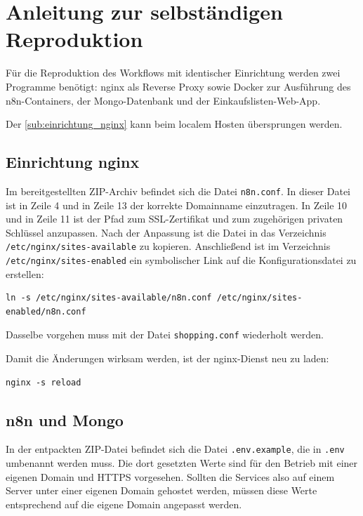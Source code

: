 \section{Anleitung zur selbständigen Reproduktion}\label{sec:cook} %
Für die Reproduktion des Workflows mit identischer Einrichtung werden zwei Programme benötigt: nginx
als Reverse Proxy sowie Docker zur Ausführung des n8n-Containers, der Mongo-Datenbank und der
Einkaufslisten-Web-App.

Der \autoref{sub:einrichtung_nginx} kann beim localem Hosten übersprungen werden.

\subsection{Einrichtung nginx}\label{sub:einrichtung_nginx} %
Im bereitgestellten ZIP-Archiv befindet sich die Datei \verb|n8n.conf|. In dieser Datei ist in Zeile
4 und in Zeile 13 der korrekte Domainname einzutragen. In Zeile 10 und in Zeile 11 ist der Pfad zum
SSL-Zertifikat und zum zugehörigen privaten Schlüssel anzupassen. Nach der Anpassung ist die Datei
in das Verzeichnis \verb|/etc/nginx/sites-available| zu kopieren. Anschließend ist im Verzeichnis
\verb|/etc/nginx/sites-enabled| ein symbolischer Link auf die Konfigurationsdatei zu erstellen:

\begin{verbatim}
ln -s /etc/nginx/sites-available/n8n.conf /etc/nginx/sites-enabled/n8n.conf
\end{verbatim}

Dasselbe vorgehen muss mit der Datei \verb|shopping.conf| wiederholt werden.

Damit die Änderungen wirksam werden, ist der nginx-Dienst neu zu laden:

\begin{verbatim}
nginx -s reload
\end{verbatim}

\subsection{n8n und Mongo}\label{sub:n_n_und_mongo} %
In der entpackten ZIP-Datei befindet sich die Datei \verb|.env.example|, die in \verb|.env|
umbenannt werden muss. Die dort gesetzten Werte sind für den Betrieb mit einer eigenen Domain und
HTTPS vorgesehen. Sollten die Services also auf einem Server unter einer eigenen Domain gehostet
werden, müssen diese Werte entsprechend auf die eigene Domain angepasst werden.

